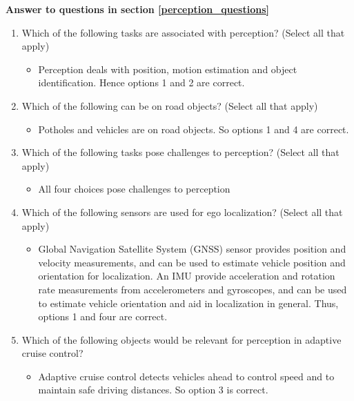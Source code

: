 {\textbf{Answer to questions in section \ref{perception_questions}}}

\begin{enumerate}

\item Which of the following tasks are associated with perception? (Select all that apply) 
\begin{itemize}
\item Perception deals with position, motion estimation and object identification. Hence options 1 and 2 are correct.
\end{itemize}

\item Which of the following can be on road objects? (Select all that apply) 

\begin{itemize}
\item Potholes and vehicles are on road objects. So options 1 and 4 are correct.
\end{itemize}

\item Which of the following tasks pose challenges to perception? (Select all that apply) 

\begin{itemize}
\item All four choices pose challenges to perception
\end{itemize}

\item Which of the following sensors are used for ego localization? (Select all that apply) 


\begin{itemize}
\item Global Navigation Satellite System (GNSS) sensor provides position and velocity measurements, and can be used to estimate vehicle position and orientation for localization. An IMU provide acceleration and rotation rate measurements from accelerometers and gyroscopes, and can be used to estimate vehicle orientation and aid in localization in general. Thus, options 1 and four are correct.
\end{itemize}

\item Which of the following objects would be relevant for perception in adaptive cruise control?


\begin{itemize}
\item Adaptive cruise control detects vehicles ahead to control speed and to maintain safe driving distances. So
option 3 is correct. 
\end{itemize}

\end{enumerate}

